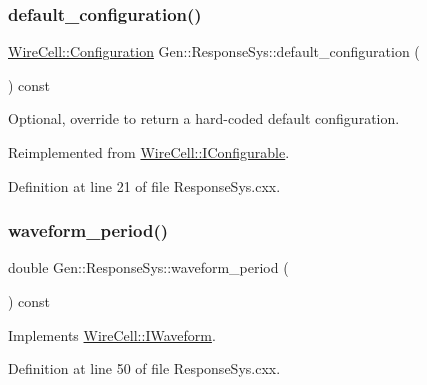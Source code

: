 \subsubsection{\texorpdfstring{default\+\_\+configuration()}{default\_configuration()}}
{\footnotesize\ttfamily \hyperlink{namespace_wire_cell_a9f705541fc1d46c608b3d32c182333ee}{Wire\+Cell\+::\+Configuration} Gen\+::\+Response\+Sys\+::default\+\_\+configuration (\begin{DoxyParamCaption}{ }\end{DoxyParamCaption}) const\hspace{0.3cm}{\ttfamily [virtual]}}



Optional, override to return a hard-\/coded default configuration. 



Reimplemented from \hyperlink{class_wire_cell_1_1_i_configurable_a54841b2da3d1ea02189478bff96f7998}{Wire\+Cell\+::\+I\+Configurable}.



Definition at line 21 of file Response\+Sys.\+cxx.

\mbox{\label{class_wire_cell_1_1_gen_1_1_response_sys_ab6bced35ba8f8279d8204d842caf868a}} 
\subsubsection{\texorpdfstring{waveform\+\_\+period()}{waveform\_period()}}
{\footnotesize\ttfamily double Gen\+::\+Response\+Sys\+::waveform\+\_\+period (\begin{DoxyParamCaption}{ }\end{DoxyParamCaption}) const\hspace{0.3cm}{\ttfamily [virtual]}}



Implements \hyperlink{class_wire_cell_1_1_i_waveform_a0d5d0cd99b8a4e49d5d8b633150b707a}{Wire\+Cell\+::\+I\+Waveform}.



Definition at line 50 of file Response\+Sys.\+cxx.

